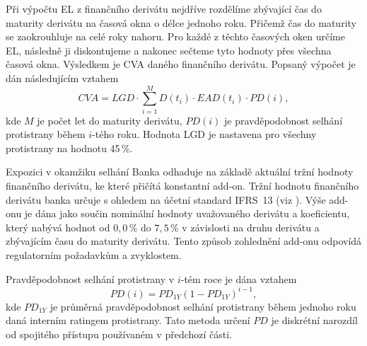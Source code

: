 \documentclass[a4paper,12pt]{report}
\theoremstyle{definition} \newtheorem{definice}[veta]{Definice}
\theoremstyle{remark}
\begin{document}
Při výpočtu EL z finančního derivátu nejdříve rozdělíme zbývající čas do maturity derivátu na časová okna o délce jednoho roku. 
Přičemž čas do maturity se zaokrouhluje na celé roky nahoru.
Pro každé z těchto časových oken určíme EL, následně ji diskontujeme a nakonec sečteme tyto hodnoty přes všechna časová okna.
Výsledkem je CVA daného finančního derivátu.
Popsaný výpočet je dán následujícím vztahem
\begin{equation}\label{CVA_banka}
CVA=LGD\cdot\sum_{i=1}^M D(t_i)\cdot EAD(t_i)\cdot PD(i),
\end{equation}
kde $M$ je počet let do maturity derivátu, $PD(i)$ je pravděpodobnost selhání protistrany během $i$-tého roku.
Hodnota LGD je nastavena pro všechny protistrany na hodnotu 45\,\%.


Expozici v okamžiku selhání Banka odhaduje na základě aktuální tržní hodnoty finančního derivátu, ke které přičítá konstantní add-on.
Tržní hodnotu finančního derivátu banka určuje s ohledem na účetní standard IFRS~13 (viz \cite{ifrs13}). 
Výše add-onu je dána jako součin nominální hodnoty uvažovaného derivátu a koeficientu, který nabývá hodnot od $0,0\,\%$ do $7,5\,\%$ v závislosti na druhu derivátu a zbývajícím času do maturity derivátu. 
Tento způsob zohlednění add-onu odpovídá regulatorním požadavkům a zvyklostem.

Pravděpodobnost selhání protistrany v $i$-tém roce je dána vztahem 
\begin{equation}\label{PD_banka}
PD(i)=PD_{1Y}(1-PD_{1Y})^{i-1},
\end{equation}
kde $PD_{1Y}$ je průměrná pravděpodobnost selhání protistrany během jednoho roku daná interním ratingem protistrany. 
Tato metoda určení $PD$ je diskrétní narozdíl od spojitého přístupu používaném v předchozí části. 
\end{document}
